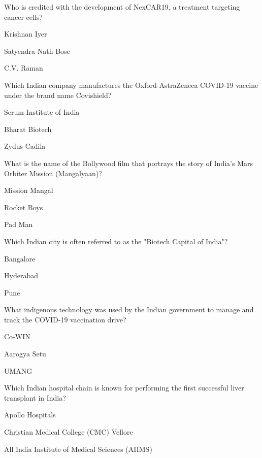 \begin{enhancedmcq}{Who is credited with the development of NexCAR19, a treatment targeting cancer cells?}
\item Krishnan Iyer
\item Satyendra Nath Bose
\item C.V. Raman

\end{enhancedmcq}
\begin{enhancedmcq}{Which Indian company manufactures the Oxford‑AstraZeneca COVID‑19 vaccine under the brand name Covishield?}
\item Serum Institute of India
\item Bharat Biotech
\item Zydus Cadila

\end{enhancedmcq}
\begin{enhancedmcq}{What is the name of the Bollywood film that portrays the story of India's Mars Orbiter Mission (Mangalyaan)?}
\item Mission Mangal
\item Rocket Boys
\item Pad Man

\end{enhancedmcq}
\begin{enhancedmcq}{Which Indian city is often referred to as the "Biotech Capital of India"?}
\item Bangalore
\item Hyderabad
\item Pune

\end{enhancedmcq}
\begin{enhancedmcq}{What indigenous technology was used by the Indian government to manage and track the COVID‑19 vaccination drive?}
\item Co‑WIN
\item Aarogya Setu
\item UMANG

\end{enhancedmcq}
\begin{enhancedmcq}{Which Indian hospital chain is known for performing the first successful liver transplant in India?}
\item Apollo Hospitals
\item Christian Medical College (CMC) Vellore
\item All India Institute of Medical Sciences (AIIMS)

\end{enhancedmcq}
